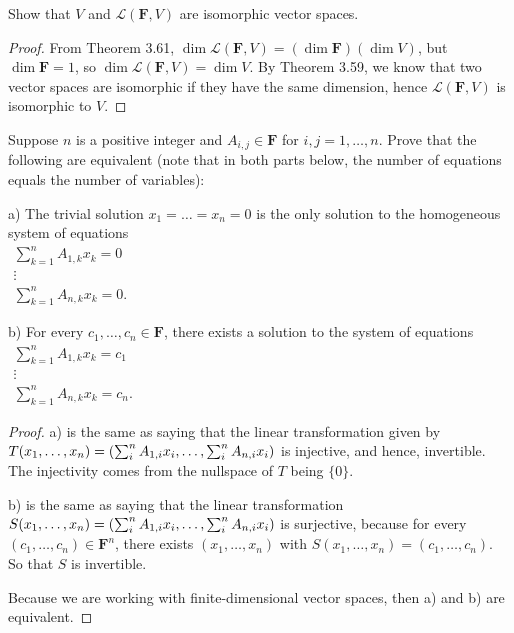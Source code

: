 \begin{exercise}{18}
  Show that $V$ and $\mathcal{L}(\mathbf{F}, V)$ are isomorphic vector spaces.
\end{exercise}
\begin{proof}
 From Theorem 3.61, $\dim\mathcal{L}(\mathbf{F},V)=(\dim \mathbf{F})(\dim V)$, but $\dim\mathbf{F}=1$, so $\dim\mathcal{L}(\mathbf{F},V)=\dim V$. By Theorem 3.59, we know that two vector spaces are isomorphic if they have the same dimension, hence $\mathcal{L}(\mathbf{F},V)$ is isomorphic to $V$.
\end{proof}


\begin{exercise}{20}
  Suppose $n$ is a positive integer and $A_{i,j}\in\mathbf{F}$ for $i,j=1,\dots,n$. Prove that the following are equivalent (note that in both parts below, the number of equations equals the number of variables):
  
  a) The trivial solution $x_{1}=\dots=x_{n}=0$ is the only solution to the homogeneous system of equations\\
  $\begin{matrix}
  \sum_{k=1}^{n}A_{1,k}x_{k}=0\\
  \vdots\\
  \sum_{k=1}^{n}A_{n,k}x_{k}=0.
  \end{matrix}
  $
  
  b) For every $c_{1},\dots,c_{n}\in\mathbf{F}$, there exists a solution to the system of equations\\
  $\begin{matrix}
  \sum_{k=1}^{n}A_{1,k}x_{k}=c_{1}\\
  \vdots\\
  \sum_{k=1}^{n}A_{n,k}x_{k}=c_{n}.
  \end{matrix}
  $
\end{exercise}
\begin{proof}
 a) is the same as saying that the linear transformation given by $T(x_{1},\dots,x_{n})\\ =\left(\sum_{i}^{n}A_{1,i}x_{i},\dots,\sum_{i}^{n}A_{n,i}x_{i}\right)$ is injective, and hence, invertible. The injectivity comes from the nullspace of $T$ being $\{0\}$.

 b) is the same as saying that the linear transformation $S(x_{1},\dots,x_{n})\\ =\left(\sum_{i}^{n}A_{1,i}x_{i},\dots,\sum_{i}^{n}A_{n,i}x_{i}\right)$ is surjective, because for every $(c_{1},\dots,c_{n})\in\mathbf{F}^{n}$, there exists $(x_{1},\dots,x_{n})$ with $S(x_{1},\dots,x_{n})=(c_{1},\dots,c_{n})$. So that $S$ is invertible.

 Because we are working with finite-dimensional vector spaces, then a) and b) are equivalent.
\end{proof}
